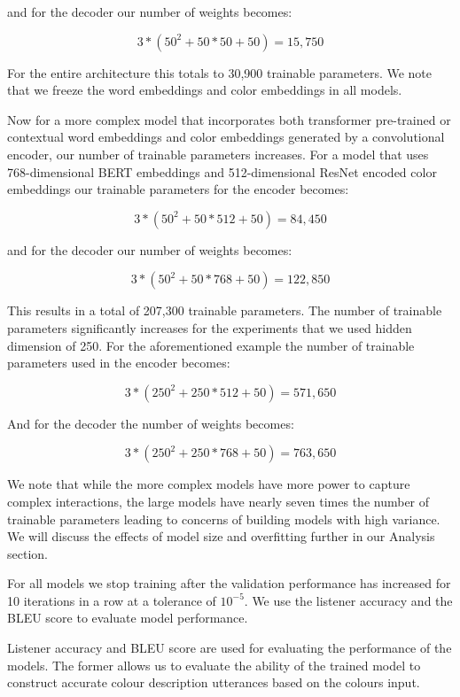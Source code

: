 \par
and for the decoder our number of weights becomes:

\[3*(50^2 + 50*50 +50) = 15,750\]

\par
For the entire architecture this totals to 30,900 trainable parameters. We note that we freeze the word embeddings and color embeddings in all models.

\par
Now for a more complex model that incorporates both transformer pre-trained or contextual word embeddings and color embeddings generated by a convolutional encoder, our number of trainable parameters increases. For a model that uses 768-dimensional BERT embeddings and 512-dimensional ResNet encoded color embeddings our trainable parameters for the encoder becomes:

\[3*(50^2 + 50*512 +50) = 84,450\]

\par
and for the decoder our number of weights becomes:

\[3*(50^2 + 50*768 +50) = 122,850\]

\par
This results in a total of 207,300 trainable parameters. The number of trainable parameters significantly increases for the experiments that we used hidden dimension of 250. For the aforementioned example the number of trainable parameters used in the encoder becomes:

\[3*(250^2 + 250*512 +50) = 571,650\]

\par
And for the decoder the number of weights becomes:

\[3*(250^2 + 250*768 +50) = 763,650\]

\par
We note that while the more complex models have more power to capture complex interactions, the large models have nearly seven times the number of trainable parameters leading to concerns of building models with high variance. We will discuss the effects of model size and overfitting further in our Analysis section.

\par
For all models we stop training after the validation performance has increased for 10 iterations in a row at a tolerance of \(10^{-5}\). We use the listener accuracy and the BLEU score to evaluate model performance.

\par
Listener accuracy and BLEU score are used for evaluating the performance of the models. The former allows us to evaluate the ability of the trained model to construct accurate colour description utterances based on the colours input.

